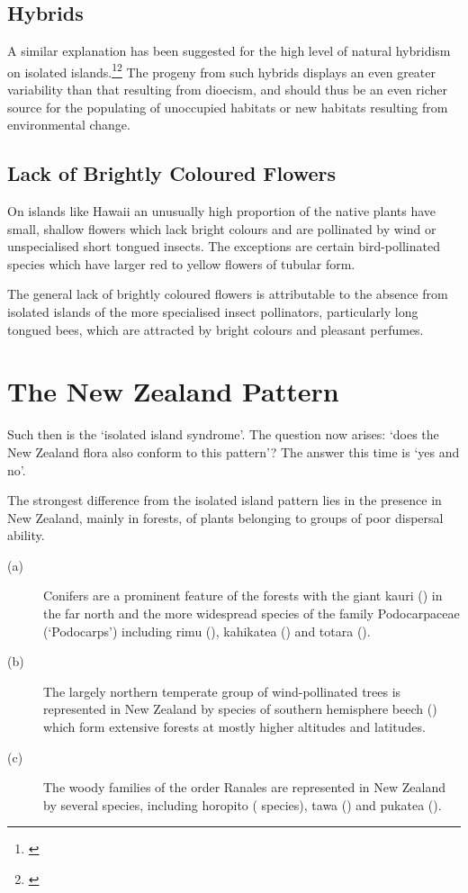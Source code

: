 \subsection{Hybrids}

A similar explanation has been suggested for the high level of natural hybridism on isolated islands.\footnote{\cite{gillett1972role}}\footnote{\cite{rattenbury1962cyclic}} The progeny from such hybrids displays an even greater variability than that resulting from dioecism, and should thus be an even richer source for the populating of unoccupied habitats or new habitats resulting from environmental change.

\subsection{Lack of Brightly Coloured Flowers}

On islands like Hawai{\okina}i an unusually high proportion of the native plants have small, shallow flowers which lack bright colours and are pollinated by wind or unspecialised short tongued insects.
The exceptions are certain bird-pollinated species which have larger red to yellow flowers of tubular form.

The general lack of brightly coloured flowers is attributable to the absence from isolated islands of the more specialised insect pollinators, particularly long tongued bees, which are attracted by bright colours and pleasant perfumes.

\section{The New Zealand Pattern}

Such then is the `isolated island syndrome'.
The question now arises: `does the New Zealand flora also conform to this pattern'? The answer this time is `yes and no'.

The strongest difference from the isolated island pattern lies in the presence in New Zealand, mainly in forests, of plants belonging to groups of poor dispersal ability.

\begin{description}
\item[{(a)}]Conifers are a prominent feature of the forests with the giant kauri () in the far north and the more widespread species of the family Podocarpaceae (`Podocarps') including rimu (), kahikatea () and totara ().
\item[{(b)}]The largely northern temperate group of wind-pollinated trees is represented in New Zealand by species of southern hemisphere beech () which form extensive forests at mostly higher altitudes and latitudes.
\item[{(c)}]The woody families of the order Ranales are represented in New Zealand by several species, including horopito ( species), tawa () and pukatea ().
\end{description}

